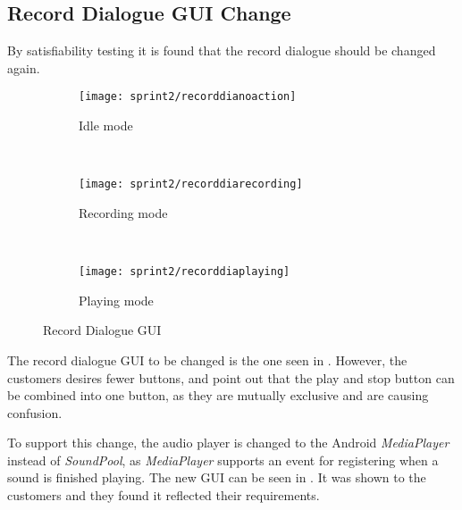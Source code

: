 \subsection{Record Dialogue GUI Change}
By satisfiability testing it is found that the record dialogue should be changed again.

\begin{figure}[h]
        \centering
        \begin{subfigure}[b]{0.3\textwidth}
                \texttt{[image: sprint2/recorddianoaction]}
                \caption{Idle mode}
                \label{fig:recordnoaction}
        \end{subfigure}%
        ~ %
        \begin{subfigure}[b]{0.3\textwidth}
                \texttt{[image: sprint2/recorddiarecording]}
                \caption{Recording mode}
                \label{fig:recordrecording}
        \end{subfigure}
        ~ %
        \begin{subfigure}[b]{0.3\textwidth}
                \texttt{[image: sprint2/recorddiaplaying]}
                \caption{Playing mode}
                \label{fig:recordplaying}
        \end{subfigure}
        \caption{Record Dialogue GUI}\label{fig:recorddia}
\end{figure}

The record dialogue GUI to be changed is the one seen in .
However, the customers desires fewer buttons, and point out that the play and stop button can be combined into one button, as they are mutually exclusive and are causing confusion.

To support this change, the audio player is changed to the Android \textit{MediaPlayer} instead of \textit{SoundPool}, as \textit{MediaPlayer} supports an event for registering when a sound is finished playing.
The new GUI can be seen in .
It was shown to the customers and they found it reflected their requirements.